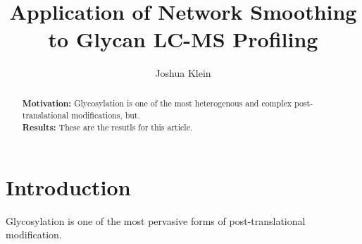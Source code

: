\documentclass{article}
\begin{document}
\newcommand{\monosaccharide}[1]{{\bf #1}}
\newcommand{\nglycan}[0]{\textit{N}-glycan }
\newcommand{\nglycans}[0]{\textit{N}-glycans }

\newcommand{\msn}[0]{$MS^n$}
\newcommand{\ms}[1]{$MS^#1$}

\newcommand{\agp}[0]{\textit{20150930-06-AGP} }
\newcommand{\phil}[0]{\textit{20141031-07-Phil-82} }
\newcommand{\philbs}[0]{\textit{20141101-04-Phil-BS} }
\newcommand{\igg}[0]{\textit{20151002-02-IGG} }
\newcommand{\dpphil}[0]{\textit{20141128-11-Phil-82} }
\newcommand{\dpagp}[0]{\textit{AGP-DR-Perm-glycans-1} }
\newcommand{\rpagp}[0]{\textit{AGP-permethylated-2ul-inj-55-SLens} }
\newcommand{\rphumanserum}[0]{\textit{Perm-BS-070111-04-Human-Serum} }


\title{Application of Network Smoothing to Glycan LC-MS Profiling}
\author{Joshua Klein}
\begin{abstract}
    \textbf{Motivation:} Glycosylation is one of the most heterogenous
    and complex post-translational modifications, but.\\
    \textbf{Results:} These are the resutls for this article.\\
\end{abstract}

\maketitle

\section{Introduction}
Glycosylation is one of the most pervasive forms of post-translational
modification.




% 

% 




\end{document}
